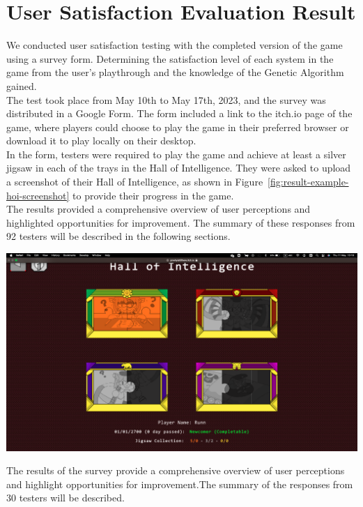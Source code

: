 \documentclass[12pt,oneside,openright,a4paper]{cpe-english-project}
\begin{document}
\section{User Satisfaction Evaluation Result}
We conducted user satisfaction testing with the completed version of the game using a survey form. Determining the satisfaction level of each system in the game from the user's playthrough and the knowledge of the Genetic Algorithm gained. \\
The test took place from May 10th to May 17th, 2023, and the survey was distributed in a Google Form. The form included a link to the itch.io page of the game, where players could choose to play the game in their preferred browser or download it to play locally on their desktop. \\
In the form, testers were required to play the game and achieve at least a silver jigsaw in each of the trays in the Hall of Intelligence. They were asked to upload a screenshot of their Hall of Intelligence, as shown in Figure~\ref{fig:result-example-hoi-screenshot} to provide their progress in the game. \\
The results provided a comprehensive overview of user perceptions and highlighted opportunities for improvement. The summary of these responses from 92 testers will be described in the following sections. \\
\begin{minipage}[c]{\textwidth}\centering
\includegraphics[width=14cm]{figure/result-example-hoi-screenshot.png}
\label{fig:result-example-hoi-screenshot}
\end{minipage}
The results of the survey provide a comprehensive overview of user perceptions and highlight opportunities for improvement.The summary of the responses from 30 testers will be described.
\end{document}
